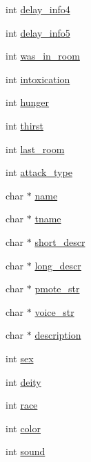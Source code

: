 \begin{DoxyCompactItemize}
\item 
int \hyperlink{structchar__data_a2e0da56388b0256693e9e27688a1e2a8}{delay\-\_\-info4}
\item 
int \hyperlink{structchar__data_a484026413f413e4575019cfbc633c936}{delay\-\_\-info5}
\item 
int \hyperlink{structchar__data_a9193210404d6d95668a5295e1827168b}{was\-\_\-in\-\_\-room}
\item 
int \hyperlink{structchar__data_a3a03ed230c556ede33f295c6d34e72b1}{intoxication}
\item 
int \hyperlink{structchar__data_a1ad3bd034e44d7dc811a273594f7de1a}{hunger}
\item 
int \hyperlink{structchar__data_a02beb55dd072cc43e28abf7e5560aa4b}{thirst}
\item 
int \hyperlink{structchar__data_af3faed4c45318f9fa36de15cfab46e39}{last\-\_\-room}
\item 
int \hyperlink{structchar__data_ab9affc833ad3919aa552e30439498b52}{attack\-\_\-type}
\item 
char $\ast$ \hyperlink{structchar__data_a65765ce5680d24654af911e0308d9878}{name}
\item 
char $\ast$ \hyperlink{structchar__data_a4e47751be5754ca404513fd7c24df902}{tname}
\item 
char $\ast$ \hyperlink{structchar__data_a63ba87bac4b78201857065eec72fe25d}{short\-\_\-descr}
\item 
char $\ast$ \hyperlink{structchar__data_a97e4b71aa071d2d77bbdaad8f853f75e}{long\-\_\-descr}
\item 
char $\ast$ \hyperlink{structchar__data_ae676607c655d2d3a33f718e0ef384aad}{pmote\-\_\-str}
\item 
char $\ast$ \hyperlink{structchar__data_a81843e62203f585fab00a6644dd41508}{voice\-\_\-str}
\item 
char $\ast$ \hyperlink{structchar__data_a806c58443a7e849255b29222fcff8882}{description}
\item 
int \hyperlink{structchar__data_ad63a1a4c0e10731fb60e29d730660316}{sex}
\item 
int \hyperlink{structchar__data_a1af026e8c395266dbab4394dc60aee89}{deity}
\item 
int \hyperlink{structchar__data_a8cef89f7bcd3759efc27ba6977a63809}{race}
\item 
int \hyperlink{structchar__data_aa5bce4409e731bafa87bddf40307cf66}{color}
\item 
int \hyperlink{structchar__data_a4611feb8cd35aaf30e03e931001f0473}{sound}
\item 

\end{DoxyCompactItemize}
